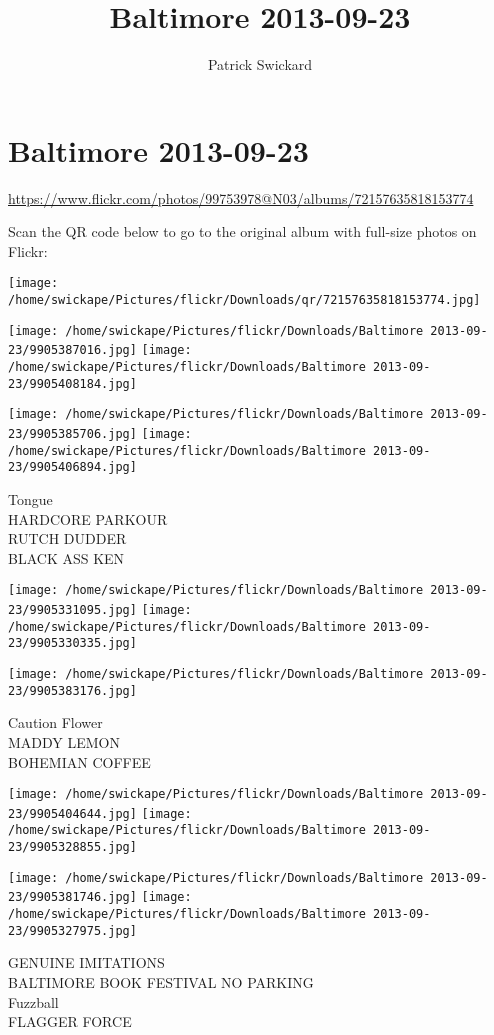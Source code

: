 \documentclass[10pt,letterpaper]{article}
\title{Baltimore 2013-09-23}
\author{Patrick Swickard}
\date{}
\begin{document}
\section*{Baltimore 2013-09-23}

\url{https://www.flickr.com/photos/99753978@N03/albums/72157635818153774}

Scan the QR code below to go to the original album with full-size photos on Flickr:

\texttt{[image: /home/swickape/Pictures/flickr/Downloads/qr/72157635818153774.jpg]}
\pagebreak

\texttt{[image: /home/swickape/Pictures/flickr/Downloads/Baltimore 2013-09-23/9905387016.jpg]}
\texttt{[image: /home/swickape/Pictures/flickr/Downloads/Baltimore 2013-09-23/9905408184.jpg]}

\texttt{[image: /home/swickape/Pictures/flickr/Downloads/Baltimore 2013-09-23/9905385706.jpg]}
\texttt{[image: /home/swickape/Pictures/flickr/Downloads/Baltimore 2013-09-23/9905406894.jpg]}

Tongue\\
HARDCORE PARKOUR\\
RUTCH DUDDER\\
BLACK ASS KEN
\pagebreak

\texttt{[image: /home/swickape/Pictures/flickr/Downloads/Baltimore 2013-09-23/9905331095.jpg]}
\texttt{[image: /home/swickape/Pictures/flickr/Downloads/Baltimore 2013-09-23/9905330335.jpg]}

\vspace{0.25in}
\texttt{[image: /home/swickape/Pictures/flickr/Downloads/Baltimore 2013-09-23/9905383176.jpg]}

Caution Flower\\
MADDY LEMON\\
BOHEMIAN COFFEE
\pagebreak

\texttt{[image: /home/swickape/Pictures/flickr/Downloads/Baltimore 2013-09-23/9905404644.jpg]}
\texttt{[image: /home/swickape/Pictures/flickr/Downloads/Baltimore 2013-09-23/9905328855.jpg]}

\texttt{[image: /home/swickape/Pictures/flickr/Downloads/Baltimore 2013-09-23/9905381746.jpg]}
\texttt{[image: /home/swickape/Pictures/flickr/Downloads/Baltimore 2013-09-23/9905327975.jpg]}

GENUINE IMITATIONS\\
BALTIMORE BOOK FESTIVAL NO PARKING\\
Fuzzball\\
FLAGGER FORCE
\pagebreak
\end{document}
